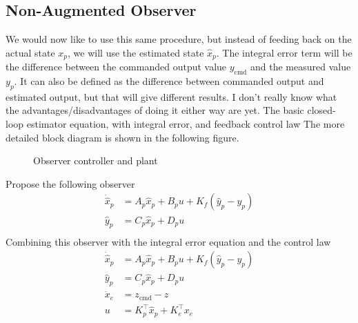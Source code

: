 \subsection{Non-Augmented Observer}

We would now like to use this same procedure, but instead of feeding back on the actual state $x_{p}$, we will use the estimated state $\hat{x}_{p}$.
The integral error term will be the difference between the commanded output value $y_{\text{cmd}}$ and the measured value $y_{p}$.
It can also be defined as the difference between commanded output and estimated output, but that will give different results.
I don't really know what the advantages/disadvantages of doing it either way are yet.
The basic closed-loop estimator equation, with integral error, and feedback control law
The more detailed block diagram is shown in the following figure.

\begin{figure}[H]
  \begin{center}
    \caption{Observer controller and plant}
  \end{center}
\end{figure}

Propose the following observer
\begin{equation*}
  \begin{split}
    \dot{\hat{x}}_{p}&=A_{p}\hat{x}_{p}+B_{p}u+K_{f}(\hat{y}_{p}-y_{p}) \\
    \hat{y}_{p}&=C_{p}\hat{x}_{p}+D_{p}u \\
  \end{split}
\end{equation*}
Combining this observer with the integral error equation and the control law
\begin{equation*}
  \begin{split}
    \dot{\hat{x}}_{p}&=A_{p}\hat{x}_{p}+B_{p}u+K_{f}(\hat{y}_{p}-y_{p}) \\
    \hat{y}_{p}&=C_{p}\hat{x}_{p}+D_{p}u \\
    \dot{x}_{e}&=z_{\text{cmd}}-z \\
    u&=K_{p}^{\top}\hat{x}_{p}+K_{e}^{\top}x_{e}
  \end{split}
\end{equation*}

